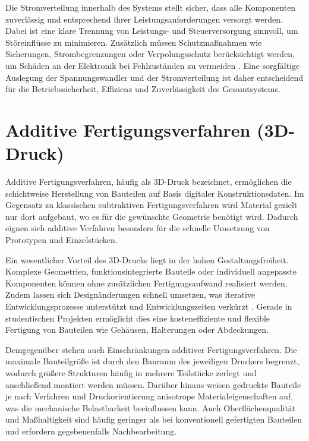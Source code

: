 Die Stromverteilung innerhalb des Systems stellt sicher, dass alle Komponenten zuverlässig und entsprechend ihrer Leistungsanforderungen versorgt werden. Dabei ist eine klare Trennung von Leistungs- und Steuerversorgung sinnvoll, um Störeinflüsse zu minimieren. Zusätzlich müssen Schutzmaßnahmen wie Sicherungen, Strombegrenzungen oder Verpolungsschutz berücksichtigt werden, um Schäden an der Elektronik bei Fehlzuständen zu vermeiden \cite{erickson2001fundamentals}.
Eine sorgfältige Auslegung der Spannungswandler und der Stromverteilung ist daher entscheidend für die Betriebssicherheit, Effizienz und Zuverlässigkeit des Gesamtsystems.

\section{Additive Fertigungsverfahren (3D-Druck)}
\label{cha:Additive Fertigungsverfahren (3D-Druck)}

Additive Fertigungsverfahren, häufig als 3D-Druck bezeichnet, ermöglichen die schichtweise Herstellung von Bauteilen auf Basis digitaler Konstruktionsdaten. Im Gegensatz zu klassischen subtraktiven Fertigungsverfahren wird Material gezielt nur dort aufgebaut, wo es für die gewünschte Geometrie benötigt wird. Dadurch eignen sich additive Verfahren besonders für die schnelle Umsetzung von Prototypen und Einzelstücken. \cite{gebhardt2016additive}

Ein wesentlicher Vorteil des 3D-Drucks liegt in der hohen Gestaltungsfreiheit. Komplexe Geometrien, funktionsintegrierte Bauteile oder individuell angepasste Komponenten können ohne zusätzlichen Fertigungsaufwand realisiert werden. Zudem lassen sich Designänderungen schnell umsetzen, was iterative Entwicklungsprozesse unterstützt und Entwicklungszeiten verkürzt \cite{gebhardt2016additive}. Gerade in studentischen Projekten ermöglicht dies eine kosteneffiziente und flexible Fertigung von Bauteilen wie Gehäusen, Halterungen oder Abdeckungen.

Demgegenüber stehen auch Einschränkungen additiver Fertigungsverfahren. Die maximale Bauteilgröße ist durch den Bauraum des jeweiligen Druckers begrenzt, wodurch größere Strukturen häufig in mehrere Teilstücke zerlegt und anschließend montiert werden müssen. Darüber hinaus weisen gedruckte Bauteile je nach Verfahren und Druckorientierung anisotrope Materialeigenschaften auf, was die mechanische Belastbarkeit beeinflussen kann. Auch Oberflächenqualität und Maßhaltigkeit sind häufig geringer als bei konventionell gefertigten Bauteilen und erfordern gegebenenfalls Nachbearbeitung. \cite{gebhardt2016additive}

